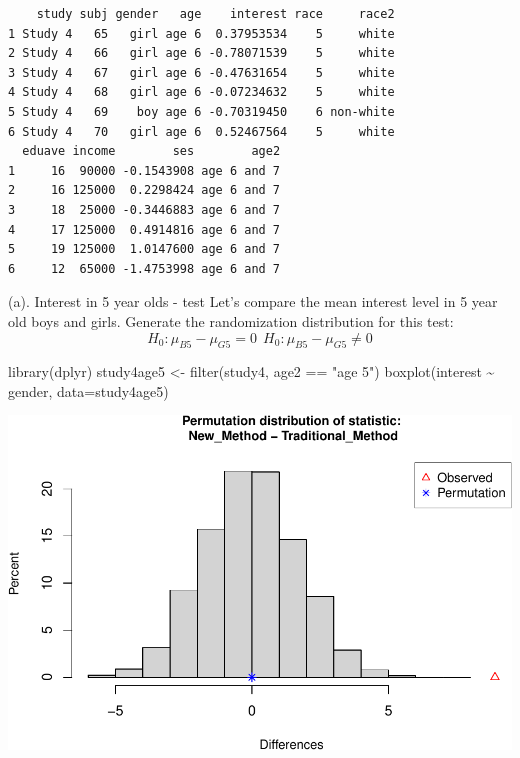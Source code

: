 \documentclass[
]{book}
\newenvironment{Shaded}{\begin{snugshade}}{\end{snugshade}}
\newcommand{\AttributeTok}[1]{\textcolor[rgb]{0.77,0.63,0.00}{#1}}
\newcommand{\FunctionTok}[1]{\textcolor[rgb]{0.00,0.00,0.00}{#1}}
\newcommand{\NormalTok}[1]{#1}
\newcommand{\OtherTok}[1]{\textcolor[rgb]{0.56,0.35,0.01}{#1}}
\newcommand{\SpecialCharTok}[1]{\textcolor[rgb]{0.00,0.00,0.00}{#1}}
\newcommand{\StringTok}[1]{\textcolor[rgb]{0.31,0.60,0.02}{#1}}
\begin{document}
\begin{verbatim}
    study subj gender   age    interest race     race2
1 Study 4   65   girl age 6  0.37953534    5     white
2 Study 4   66   girl age 6 -0.78071539    5     white
3 Study 4   67   girl age 6 -0.47631654    5     white
4 Study 4   68   girl age 6 -0.07234632    5     white
5 Study 4   69    boy age 6 -0.70319450    6 non-white
6 Study 4   70   girl age 6  0.52467564    5     white
  eduave income        ses        age2
1     16  90000 -0.1543908 age 6 and 7
2     16 125000  0.2298424 age 6 and 7
3     18  25000 -0.3446883 age 6 and 7
4     17 125000  0.4914816 age 6 and 7
5     19 125000  1.0147600 age 6 and 7
6     12  65000 -1.4753998 age 6 and 7
\end{verbatim}

(a). Interest in 5 year olds - test
Let's compare the mean interest level in 5 year old boys and girls. Generate the randomization distribution for this test:
\[
H_0: \mu_{B5} - \mu_{G5} = 0 \ \ H_0: \mu_{B5} - \mu_{G5} \neq 0
\]

\begin{Shaded}
\begin{Highlighting}[]
\FunctionTok{library}\NormalTok{(dplyr)}
\NormalTok{study4age5 }\OtherTok{\textless{}{-}} \FunctionTok{filter}\NormalTok{(study4, age2 }\SpecialCharTok{==} \StringTok{"age 5"}\NormalTok{)}
\FunctionTok{boxplot}\NormalTok{(interest }\SpecialCharTok{\textasciitilde{}}\NormalTok{ gender, }\AttributeTok{data=}\NormalTok{study4age5)}
\end{Highlighting}
\end{Shaded}

\includegraphics[width=1\linewidth]{Class_Activity_13_files/figure-latex/unnamed-chunk-2-1}
\end{document}
